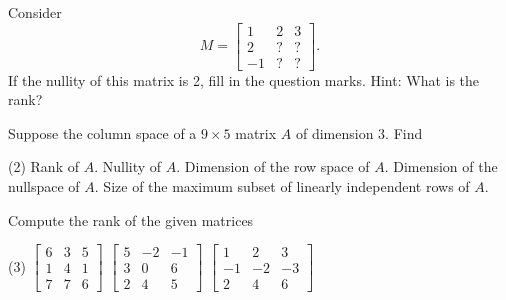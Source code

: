 \documentclass{ximera}
\begin{document}
\begin{exercise}
    Consider
    \begin{equation*}
        M =
        \begin{bmatrix}
            1 & 2 & 3 \\
            2 & ? & ? \\
            -1 & ? & ?
        \end{bmatrix} .
    \end{equation*}
    If the nullity of this matrix is 2, fill in the question marks.  Hint: What is the rank?
\end{exercise}

\begin{exercise}%
    Suppose the column space of a $9 \times 5$ matrix $A$ of dimension 3.  Find
    \begin{tasks}(2)
        \task Rank of $A$.
        \task Nullity of $A$.
        \task Dimension of the row space of $A$.
        \task Dimension of the nullspace of $A$.
        \task Size of the maximum subset of linearly independent rows of $A$.
    \end{tasks}
\end{exercise}


\begin{exercise} \label{exercise:rankmatrix}
    Compute the rank of the given matrices
    \begin{tasks}(3)
        \task
        $\begin{bmatrix}
            6 & 3 & 5 \\
            1 & 4 & 1 \\
            7 & 7 & 6
        \end{bmatrix}$
        \task
        $\begin{bmatrix}
            5 & -2 & -1 \\
            3 & 0 & 6 \\
            2 & 4 & 5
        \end{bmatrix}$
        \task
        $\begin{bmatrix}
            1 & 2 & 3 \\
            -1 & -2 & -3 \\
            2 & 4 & 6
        \end{bmatrix}$
    \end{tasks}
\end{exercise}
\end{document}

